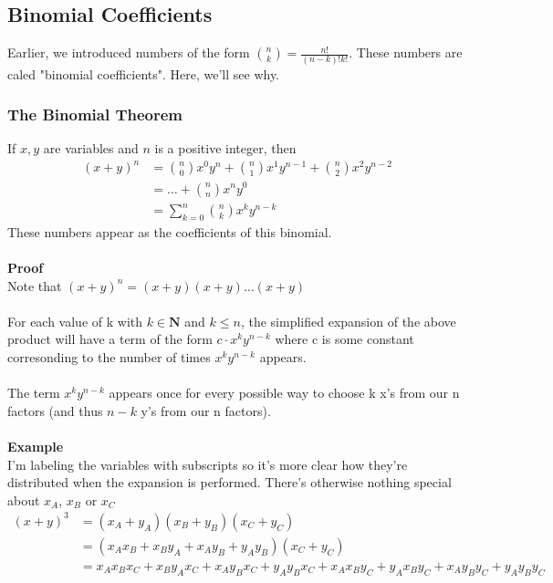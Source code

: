 \documentclass[12pt]{article}
\begin{document}
	\subsection{Binomial Coefficients}
	Earlier, we introduced numbers of the form ${n \choose k} = \frac{n!}{(n - k)!k!}$. These numbers are caled "binomial coefficients". Here, we'll see why.
	\subsubsection{The Binomial Theorem}
	If $x, y$ are variables and $n$ is a positive integer, then
	\begin{align*}
		(x + y)^n &= {n \choose 0}x^0y^n + {n \choose 1}x^1y^{n-1} + {n \choose 2}x^2y^{n-2} \\
				  &= \ldots + {n \choose n}x^ny^0 \\
				  &= \sum_{k=0}^{n} {n \choose k}x^ky^{n-k}
	\end{align*}
	These numbers appear as the coefficients of this binomial.\\\\
	\textbf{Proof}\\
	Note that $(x + y)^n = (x+y)(x+y)\ldots(x+y)$ \\\\
	For each value of k with $k \in \mathbf{N}$ and $k \leq n$, the simplified expansion of the above product will have a term of the form $c \cdot x^ky^{n-k}$ where c is some constant corresonding to the number of times $x^ky^{n-k}$ appears.\\\\
	The term $x^ky^{n - k}$ appears once for every possible way to choose k x's from our n factors (and thus $n - k$ y's from our n factors).\\\\
	\textbf{Example}\\
	I'm labeling the variables with subscripts so it's more clear how they're distributed when the expansion is performed. There's otherwise nothing special about $x_A$, $x_B$ or $x_C$
	\begin{align*}
		(x+y)^3 &= (x_A+y_A)(x_B+y_B)(x_C+y_C) \\
				&= (x_Ax_B + x_By_A + x_Ay_B + y_Ay_B)(x_C+y_C) \\
				&= x_Ax_Bx_C + x_By_Ax_C + x_Ay_Bx_C + y_Ay_Bx_C + x_Ax_By_C + y_Ax_By_C + x_Ay_By_C + y_Ay_By_C
	\end{align*}
\end{document}

